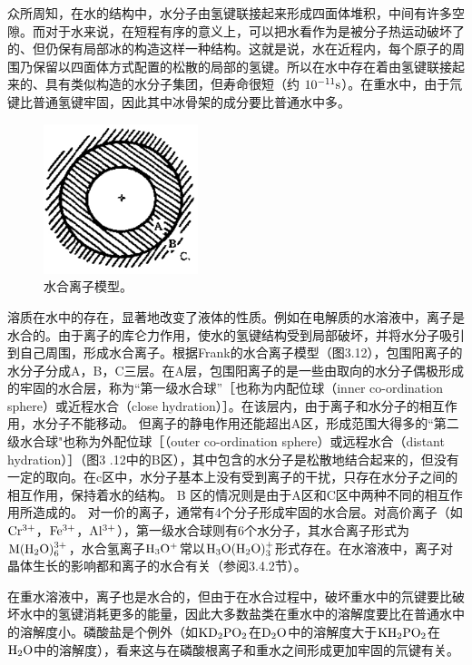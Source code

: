 众所周知，在水的结构中，水分子由氢键联接起来形成四面体堆积，中间有许多空隙。而对于水来说，在短程有序的意义上，可以把水看作为是被分子热运动破坏了的、但仍保有局部冰的构造这样一种结构。这就是说，水在近程内，每个原子的周围乃保留以四面体方式配置的松散的局部的氢键。所以在水中存在着由氢键联接起来的、具有类似构造的水分子集团，但寿命很短（约 $\rm 10^{-11}s$）。在重水中，由于氘键比普通氢键牢固，因此其中冰骨架的成分要比普通水中多。

\begin{figure}[htb]
 \centering
 \includegraphics[width=0.4\textwidth]{fig/cp03/img3.12.jpg}
 \caption{水合离子模型。}
\end{figure}

溶质在水中的存在，显著地改变了液体的性质。例如在电解质的水溶液中，离子是水合的。由于离子的库仑力作用，使水的氢键结构受到局部破坏，并将水分子吸引到自己周围，形成水合离子。根据Frank的水合离子模型（图3.12），包围阳离子的水分子分成A，B，C三层。在A层，包围阳离子的是一些由取向的水分子偶极形成的牢固的水合层，称为“第一级水合球”［也称为内配位球（inner co-ordination sphere）或近程水合（close hydration）］。在该层内，由于离子和水分子的相互作用，水分子不能移动。 但离子的静电作用还能超出A区，形成范围大得多的“第二级水合球"也称为外配位球［（outer co-ordination sphere）或远程水合（distant hydration）］（图3 .12中的B区），其中包含的水分子是松散地结合起来的，但没有一定的取向。在c区中，水分子基本上没有受到离子的干扰，只存在水分子之间的相互作用，保持着水的结构。 B 区的情况则是由于A区和C区中两种不同的相互作用所造成的。 对一价的离子，通常有4个分子形成牢固的水合层。对高价离子（如$\rm Cr^{3+}$，$\rm Fe^{3+}$，$\rm Al^{3+}$），第一级水合球则有6个水分子，其水合离子形式为$\rm M(H_2O)_6^{3+}$，水合氢离子$\rm H_3O^+$常以$\rm H_3O(H_2O)_3^{+}$形式存在。在水溶液中，离子对晶体生长的影响都和离子的水合有关（参阅3.4.2节）。

在重水溶液中，离子也是水合的，但由于在水合过程中，破坏重水中的氘键要比破坏水中的氢键消耗更多的能量，因此大多数盐类在重水中的溶解度要比在普通水中的溶解度小。磷酸盐是个例外（如$\rm KD_2PO_2$在$\rm D_2O$中的溶解度大于$\rm KH_2PO_2$在$\rm H_2O$中的溶解度），看来这与在磷酸根离子和重水之间形成更加牢固的氘键有关。

